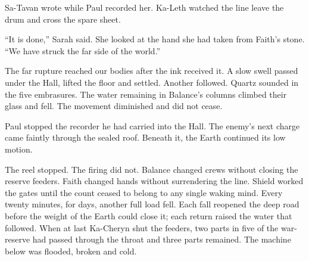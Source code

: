 Sa-Tavan wrote while Paul recorded her. Ka-Leth watched the line leave the drum and cross the spare sheet.\par

``It is done,'' Sarah said. She looked at the hand she had taken from Faith's stone. ``We have struck the far side of the world.''\par

The far rupture reached our bodies after the ink received it. A slow swell passed under the Hall, lifted the floor and settled. Another followed. Quartz sounded in the five embrasures. The water remaining in Balance's columns climbed their glass and fell. The movement diminished and did not cease.\par

Paul stopped the recorder he had carried into the Hall. The enemy's next charge came faintly through the sealed roof. Beneath it, the Earth continued its low motion.\par

The reel stopped. The firing did not. Balance changed crews without closing the reserve feeders. Faith changed hands without surrendering the line. Shield worked the gates until the count ceased to belong to any single waking mind. Every twenty minutes, for days, another full load fell. Each fall reopened the deep road before the weight of the Earth could close it; each return raised the water that followed. When at last Ka-Cheryn shut the feeders, two parts in five of the war-reserve had passed through the throat and three parts remained. The machine below was flooded, broken and cold.\par
